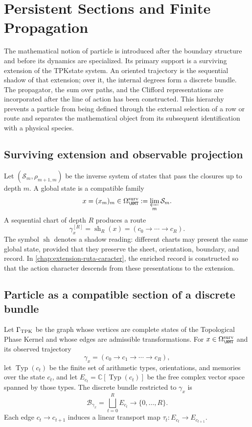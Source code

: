 \chapter{Persistent Sections and Finite Propagation}
\label{chap:particula}

The mathematical notion of particle is introduced after the boundary structure and before its dynamics are specialized. Its primary support is a surviving extension of the TPK\@ state system. An oriented trajectory is the sequential shadow of that extension; over it, the internal degrees form a discrete bundle. The propagator, the sum over paths, and the Clifford representations are incorporated after the line of action has been constructed. This hierarchy prevents a particle from being defined through the external selection of a row or route and separates the mathematical object from its subsequent identification with a physical species.

\section{Surviving extension and observable projection}

Let \((\mathcal S_m,\rho_{m+1,m})\) be the inverse system of states that
pass the closures up to depth \(m\). A global state is a compatible
family
\[
 x=(x_m)_m\in\Omega_{\HMT}^{\rm surv}
 :=\varprojlim_m\mathcal S_m.
\]
A sequential chart of depth \(R\) produces a route
\[
 \gamma_x^{[R]}=\operatorname{sh}_R(x)
 =(c_0\longrightarrow\cdots\longrightarrow c_R).
\]
The symbol \(\operatorname{sh}\) denotes a shadow reading: different charts may
present the same global state, provided that they preserve the sheet,
orientation, boundary, and record. In \cref{chap:extension-ruta-caracter}, the enriched record is
constructed so that the action character descends from these presentations
to the extension.

\section{Particle as a compatible section of a discrete bundle}

Let \(\Gamma_{\rm TPK}\) be the graph whose vertices are complete states of the
Topological Phase Kernel and whose edges are admissible transformations.
For \(x\in\Omega_{\HMT}^{\rm surv}\) and its observed trajectory
\[
 \gamma_x=(c_0\longrightarrow c_1\longrightarrow\cdots
 \longrightarrow c_R),
\]
let \(\operatorname{Typ}(c_t)\) be the finite set of arithmetic types,
orientations, and memories over the state \(c_t\), and let
\(E_{c_t}=\mathbb C[\operatorname{Typ}(c_t)]\) be the free complex vector space
spanned by those types. The discrete bundle restricted to \(\gamma_x\) is
\[
 \mathcal B_{\gamma_x}=\bigsqcup_{t=0}^{R}E_{c_t}
 \longrightarrow\{0,\ldots,R\}.
\]
Each edge \(c_t\to c_{t+1}\) induces a linear transport map
\(\tau_t:E_{c_t}\to E_{c_{t+1}}\).

